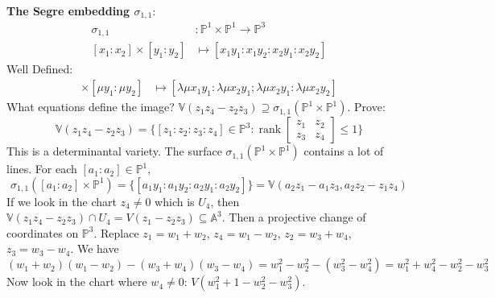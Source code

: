 \documentclass{report}
\begin{document}
\textbf{The Segre embedding $ \sigma_{1, 1}$}: 
    \begin{align*}
        \sigma_{1, 1}                        &:       \mathbb{P}^{1} \times \mathbb{P}^{1} \rightarrow \mathbb{P}^{3} \\
        [x_{1} : x_{2}] \times [y_{1}: y_{2}] &\mapsto  [x_{1}y_{1} : x_{1}y_{2} : x_{2} y_{1} : x_{2}y_{2}]             
    \end{align*}
Well Defined:
    \begin{align*}
        [\lambda x_{1} : \lambda x_{2}] \times [\mu y_{1} : \mu y_{2}] &\mapsto  [\lambda \mu x_{1}y_{1} : \lambda \mu x_{2}y_{1} ; \lambda \mu x_{2}y_{1} : \lambda \mu x_{2}y_{2}]   
    \end{align*}
What equations define the image? $\mathbb{V}(z_{1}z_{4} - z_{2}z_{3}) \supseteq \sigma_{1, 1}(\mathbb{P}^{1}\times \mathbb{P}^{1})$. Prove:
    \begin{equation*}
        \mathbb{V}(z_{1}z_{4} - z_{2}z_{3}) = \{[z_{1} : z_{2} : z_{3} : z_{4}] \in \mathbb{P}^{3} : \mathop{rank}\begin{bmatrix}
            z_{1} & z_{2} \\
            z_{3} & z_{4}   
        \end{bmatrix} \leq 1\}
    \end{equation*}
This is a determinantal variety. The surface $\sigma_{1, 1}(\mathbb{P}^{1} \times \mathbb{P}^{1})$ contains a lot of lines. For each $[a_{1} : a_{2}] \in \mathbb{P}^{1}$, 
    \begin{equation*}
        \sigma_{1, 1}([a_{1} : a_{2}] \times \mathbb{P}^{1}) = \{[a_{1}y_{1} : a_{1}y_{2} : a_{2}y_{1} : a_{2}y_{2}]\} = \mathbb{V}(a_{2}z_{1} - a_{1}z_{3}, a_{2}z_{2} - z_{1}z_{4})
    \end{equation*}
If we look in the chart $z_{4} \neq 0$ which is $U_{4}$, then $\mathbb{V}(z_{1}z_{4} - z_{2}z_{3}) \cap U_{4} = V(z_{1} - z_{2}z_{3}) \subseteq \mathbb{A}^{3}$. Then a projective change of coordinates on $\mathbb{P}^{3}$. Replace $z_{1} = w_{1} + w_{2}$, $z_{4} = w_{1} - w_{2}$, $z_{2} = w_{3} + w_{4}$, $z_{3} = w_{3} - w_{4}$. We have
    \begin{equation*}
        (w_{1} + w_{2})(w_{1} - w_{2}) - (w_{3} + w_{4})(w_{3} - w_{4}) = w_{1}^{2} - w_{2}^{2} - (w_{3}^{2} - w_{4}^{2}) = w_{1}^{2} + w_{4}^{2} - w_{2}^{2} - w_{3}^{2}
    \end{equation*}
Now look in the chart where $w_{4} \neq 0$: $V(w_{1}^{2} + 1 - w_{2}^{2} - w_{3}^{2})$.
\end{document}
